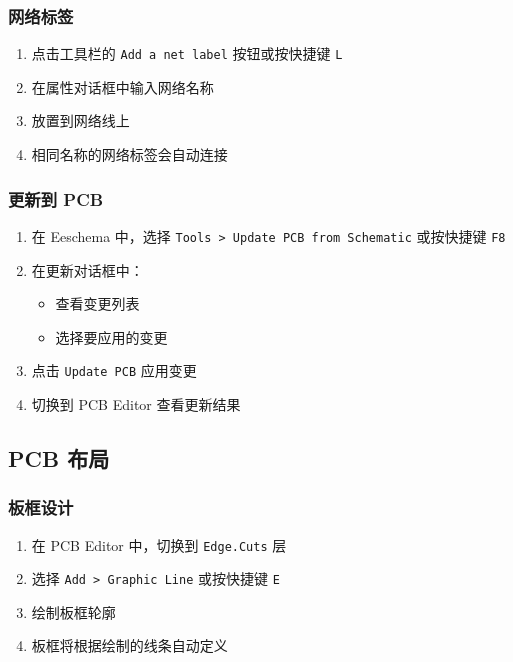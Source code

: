\subsubsection{网络标签}


\begin{enumerate}
  \item 点击工具栏的 \lstinline{Add a net label} 按钮或按快捷键 \lstinline{L}
  \item 在属性对话框中输入网络名称
  \item 放置到网络线上
  \item 相同名称的网络标签会自动连接
\end{enumerate}

\subsubsection{更新到 PCB}


\begin{enumerate}
  \item 在 Eeschema 中，选择 \lstinline{Tools > Update PCB from Schematic} 或按快捷键 \lstinline{F8}
  \item 在更新对话框中：
    \begin{itemize}
      \item 查看变更列表
      \item 选择要应用的变更
    \end{itemize}
  \item 点击 \lstinline{Update PCB} 应用变更
  \item 切换到 PCB Editor 查看更新结果
\end{enumerate}

\subsection{PCB 布局}

\subsubsection{板框设计}


\begin{enumerate}
  \item 在 PCB Editor 中，切换到 \lstinline{Edge.Cuts} 层
  \item 选择 \lstinline{Add > Graphic Line} 或按快捷键 \lstinline{E}
  \item 绘制板框轮廓
  \item 板框将根据绘制的线条自动定义
\end{enumerate}

